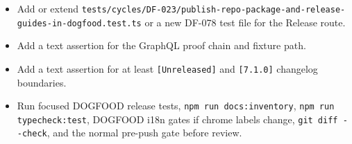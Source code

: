 \begin{itemize}
\tightlist
\item
  Add or extend \texttt{t\allowbreak{}e\allowbreak{}s\allowbreak{}t\allowbreak{}s\allowbreak{}/\allowbreak{}c\allowbreak{}y\allowbreak{}c\allowbreak{}l\allowbreak{}e\allowbreak{}s\allowbreak{}/\allowbreak{}D\allowbreak{}F\allowbreak{}-\allowbreak{}0\allowbreak{}2\allowbreak{}3\allowbreak{}/\allowbreak{}p\allowbreak{}u\allowbreak{}b\allowbreak{}l\allowbreak{}i\allowbreak{}s\allowbreak{}h\allowbreak{}-\allowbreak{}r\allowbreak{}e\allowbreak{}p\allowbreak{}o\allowbreak{}-\allowbreak{}p\allowbreak{}a\allowbreak{}c\allowbreak{}k\allowbreak{}a\allowbreak{}g\allowbreak{}e\allowbreak{}-\allowbreak{}a\allowbreak{}n\allowbreak{}d\allowbreak{}-\allowbreak{}r\allowbreak{}e\allowbreak{}l\allowbreak{}e\allowbreak{}a\allowbreak{}s\allowbreak{}e\allowbreak{}-\allowbreak{}g\allowbreak{}u\allowbreak{}i\allowbreak{}d\allowbreak{}e\allowbreak{}s\allowbreak{}-\allowbreak{}i\allowbreak{}n\allowbreak{}-\allowbreak{}d\allowbreak{}o\allowbreak{}g\allowbreak{}f\allowbreak{}o\allowbreak{}o\allowbreak{}d\allowbreak{}.\allowbreak{}t\allowbreak{}e\allowbreak{}s\allowbreak{}t\allowbreak{}.\allowbreak{}t\allowbreak{}s} or a new DF-078 test file for the Release route.
\item
  Add a text assertion for the GraphQL proof chain and fixture path.
\item
  Add a text assertion for at least \texttt{[\allowbreak{}U\allowbreak{}n\allowbreak{}r\allowbreak{}e\allowbreak{}l\allowbreak{}e\allowbreak{}a\allowbreak{}s\allowbreak{}e\allowbreak{}d\allowbreak{}]} and \texttt{[\allowbreak{}7\allowbreak{}.\allowbreak{}1\allowbreak{}.\allowbreak{}0\allowbreak{}]} changelog boundaries.
\item
  Run focused DOGFOOD release tests, \texttt{n\allowbreak{}p\allowbreak{}m\allowbreak{} \allowbreak{}r\allowbreak{}u\allowbreak{}n\allowbreak{} \allowbreak{}d\allowbreak{}o\allowbreak{}c\allowbreak{}s\allowbreak{}:\allowbreak{}i\allowbreak{}n\allowbreak{}v\allowbreak{}e\allowbreak{}n\allowbreak{}t\allowbreak{}o\allowbreak{}r\allowbreak{}y}, \texttt{n\allowbreak{}p\allowbreak{}m\allowbreak{} \allowbreak{}r\allowbreak{}u\allowbreak{}n\allowbreak{} \allowbreak{}t\allowbreak{}y\allowbreak{}p\allowbreak{}e\allowbreak{}c\allowbreak{}h\allowbreak{}e\allowbreak{}c\allowbreak{}k\allowbreak{}:\allowbreak{}t\allowbreak{}e\allowbreak{}s\allowbreak{}t}, DOGFOOD i18n gates if chrome labels change, \texttt{g\allowbreak{}i\allowbreak{}t\allowbreak{} \allowbreak{}d\allowbreak{}i\allowbreak{}f\allowbreak{}f\allowbreak{} \allowbreak{}-\allowbreak{}-\allowbreak{}c\allowbreak{}h\allowbreak{}e\allowbreak{}c\allowbreak{}k}, and the normal pre-push gate before review.
\end{itemize}

